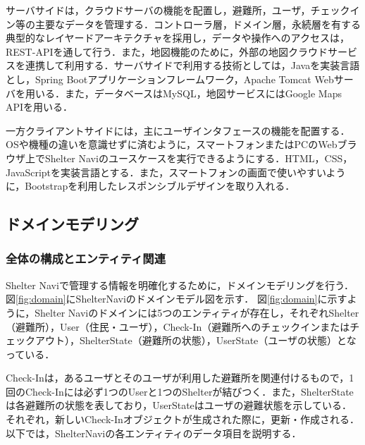 \documentclass[technicalreport,dvipdfmx]{ieicej}
\begin{document}
サーバサイドは，クラウドサーバの機能を配置し，避難所，ユーザ，チェックイン等の主要なデータを管理する．コントローラ層，ドメイン層，永続層を有する典型的なレイヤードアーキテクチャを採用し，データや操作へのアクセスは，REST-APIを通して行う．また，地図機能のために，外部の地図クラウドサービスを連携して利用する．サーバサイドで利用する技術としては，Javaを実装言語とし，Spring Bootアプリケーションフレームワーク，Apache Tomcat Webサーバを用いる．また，データベースはMySQL，地図サービスにはGoogle Maps APIを用いる．

一方クライアントサイドには，主にユーザインタフェースの機能を配置する．OSや機種の違いを意識せずに済むように，スマートフォンまたはPCのWebブラウザ上でShelter Naviのユースケースを実行できるようにする．HTML，CSS，JavaScriptを実装言語とする．また，スマートフォンの画面で使いやすいように，Bootstrapを利用したレスポンシブルデザインを取り入れる．



\subsection{ドメインモデリング}

\subsubsection{全体の構成とエンティティ関連}

Shelter Naviで管理する情報を明確化するために，ドメインモデリングを行う．
図\ref{fig:domain}にShelterNaviのドメインモデル図を示す．
図\ref{fig:domain}に示すように，Shelter Naviのドメインには5つのエンティティが存在し，それぞれShelter（避難所），User（住民・ユーザ），Check-In（避難所へのチェックインまたはチェックアウト），ShelterState（避難所の状態），UserState（ユーザの状態）となっている．

Check-Inは，あるユーザとそのユーザが利用した避難所を関連付けるもので，1回のCheck-Inには必ず1つのUserと1つのShelterが結びつく．また，ShelterStateは各避難所の状態を表しており，UserStateはユーザの避難状態を示している．それぞれ，新しいCheck-Inオブジェクトが生成された際に，更新・作成される．
以下では，ShelterNaviの各エンティティのデータ項目を説明する．
\end{document}
